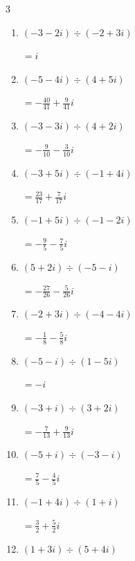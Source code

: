 \begin{multicols}{3}
\begin{enumerate}
        $\displaystyle =\frac{36}{41}+\frac{4}{41}i$

  \item $\displaystyle (-3-2i)\div(-2+3i)$

        $\displaystyle =i$

  \item $\displaystyle (-5-4i)\div(4+5i)$

        $\displaystyle =-\frac{40}{41}+\frac{9}{41}i$

  \item $\displaystyle (-3-3i)\div(4+2i)$

        $\displaystyle =-\frac{9}{10}-\frac{3}{10}i$

  \item $\displaystyle (-3+5i)\div(-1+4i)$

        $\displaystyle =\frac{23}{17}+\frac{7}{17}i$

  \item $\displaystyle (-1+5i)\div(-1-2i)$

        $\displaystyle =-\frac{9}{5}-\frac{7}{5}i$

  \item $\displaystyle (5+2i)\div(-5-i)$

        $\displaystyle =-\frac{27}{26}-\frac{5}{26}i$

  \item $\displaystyle (-2+3i)\div(-4-4i)$

        $\displaystyle =-\frac{1}{8}-\frac{5}{8}i$

  \item $\displaystyle (-5-i)\div(1-5i)$

        $\displaystyle =-i$

\columnbreak %

  \item $\displaystyle (-3+i)\div(3+2i)$

        $\displaystyle =-\frac{7}{13}+\frac{9}{13}i$

  \item $\displaystyle (-5+i)\div(-3-i)$

        $\displaystyle =\frac{7}{5}-\frac{4}{5}i$

  \item $\displaystyle (-1+4i)\div(1+i)$

        $\displaystyle =\frac{3}{2}+\frac{5}{2}i$

  \item $\displaystyle (1+3i)\div(5+4i)$


\end{enumerate}
\end{multicols}
